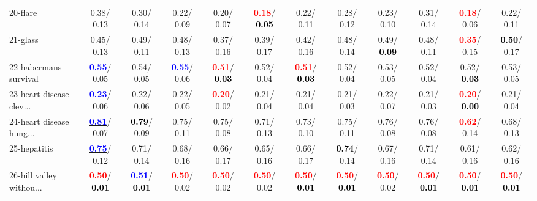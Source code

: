 \begin{table}[h]
\begin{center}
{\begin{tabular}{lc|c|c|c|c|c|c|c|c|c|c}
20-flare &   0.38/  0.13 &   0.30/  0.14 &   0.22/  0.09 &   0.20/  0.07 & \textcolor{red}{\textbf{  0.18}}/\textcolor{black}{\textbf{  0.05}} &   0.22/  0.11 &   0.28/  0.12 &   0.23/  0.10 &   0.31/  0.14 & \textcolor{red}{\textbf{  0.18}}/  0.06 &   0.22/  0.11 \\
21-glass &   0.45/  0.13 &   0.49/  0.11 &   0.48/  0.13 &   0.37/  0.16 &   0.39/  0.17 &   0.42/  0.16 &   0.48/  0.14 &   0.49/\textcolor{black}{\textbf{  0.09}} &   0.48/  0.11 & \textcolor{red}{\textbf{  0.35}}/  0.15 & \textcolor{black}{\textbf{  0.50}}/  0.17 \\ \hline
22-habermans survival & \textcolor{blue}{\textbf{  0.55}}/  0.05 &   0.54/  0.05 & \textcolor{blue}{\textbf{  0.55}}/  0.06 & \textcolor{red}{\textbf{  0.51}}/\textcolor{black}{\textbf{  0.03}} &   0.52/  0.04 & \textcolor{red}{\textbf{  0.51}}/\textcolor{black}{\textbf{  0.03}} &   0.52/  0.04 &   0.53/  0.05 &   0.52/  0.04 &   0.52/\textcolor{black}{\textbf{  0.03}} &   0.53/  0.05 \\
23-heart disease clev... & \textcolor{blue}{\textbf{  0.23}}/  0.06 &   0.22/  0.06 &   0.22/  0.05 & \textcolor{red}{\textbf{  0.20}}/  0.02 &   0.21/  0.04 &   0.21/  0.04 &   0.21/  0.03 &   0.22/  0.07 &   0.21/  0.03 & \textcolor{red}{\textbf{  0.20}}/\textcolor{black}{\textbf{  0.00}} &   0.21/  0.04 \\
24-heart disease hung... & \underline{\textcolor{blue}{\textbf{  0.81}}}/  0.07 & \textcolor{black}{\textbf{  0.79}}/  0.09 &   0.75/  0.11 &   0.75/  0.08 &   0.71/  0.13 &   0.73/  0.10 &   0.75/  0.11 &   0.76/  0.08 &   0.76/  0.08 & \textcolor{red}{\textbf{  0.62}}/  0.14 &   0.68/  0.13 \\
25-hepatitis & \underline{\textcolor{blue}{\textbf{  0.75}}}/  0.12 &   0.71/  0.14 &   0.68/  0.16 &   0.66/  0.17 &   0.65/  0.16 &   0.66/  0.17 & \textcolor{black}{\textbf{  0.74}}/  0.14 &   0.67/  0.16 &   0.71/  0.14 &   0.61/  0.16 &   0.62/  0.16 \\
26-hill valley withou... & \textcolor{red}{\textbf{  0.50}}/\textcolor{black}{\textbf{  0.01}} & \textcolor{blue}{\textbf{  0.51}}/\textcolor{black}{\textbf{  0.01}} & \textcolor{red}{\textbf{  0.50}}/  0.02 & \textcolor{red}{\textbf{  0.50}}/  0.02 & \textcolor{red}{\textbf{  0.50}}/  0.02 & \textcolor{red}{\textbf{  0.50}}/\textcolor{black}{\textbf{  0.01}} & \textcolor{red}{\textbf{  0.50}}/\textcolor{black}{\textbf{  0.01}} & \textcolor{red}{\textbf{  0.50}}/  0.02 & \textcolor{red}{\textbf{  0.50}}/\textcolor{black}{\textbf{  0.01}} & \textcolor{red}{\textbf{  0.50}}/\textcolor{black}{\textbf{  0.01}} & \textcolor{red}{\textbf{  0.50}}/\textcolor{black}{\textbf{  0.01}} \\

\end{tabular}}
\end{center}
\end{table}

